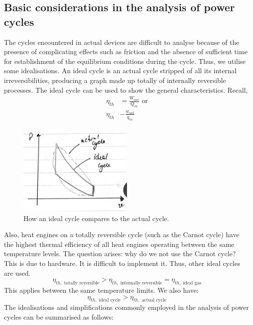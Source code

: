 \documentclass[class=report, crop=false, 12pt,a4paper]{standalone}
\begin{document}
\subsection{Basic considerations in the analysis of power cycles}
The cycles encountered in actual devices are difficult to analyse because of the presence of complicating effects such as friction and the absence of sufficient time for establishment of the equilibrium conditions during the cycle. Thus, we utilise some idealisations. An ideal cycle is an actual cycle stripped of all its internal irreversibilities, producing a graph made up totally of internally reversible processes. The ideal cycle can be used to show the general characteristics. Recall,
\begin{align}
  \eta_{th} &= \frac{W_{net}}{Q_{in}} \textrm{ or}\\
  \eta_{th} &- \frac{w_{net}}{q_{in}} 
\end{align}
\begin{figure}[h]
  \centering
  \includegraphics[width = 0.5\textwidth]{../img/actualvsidealcycle}
  \caption{How an ideal cycle compares to the actual cycle.}
  \label{fig:actualvsidealcycle}
\end{figure}
Also, heat engines on a totally reversible cycle (such as the Carnot cycle) have the highest thermal efficiency of all heat engines operating between the same temperature levels. The question arises: why do we not use the Carnot cycle? This is due to hardware. It is difficult to implement it. Thus, other ideal cycles are used.
\begin{equation}
  \eta_{th, \textrm{ totally reversible}} > \eta_{th, \textrm{ internally reversible}} = \eta_{th, \textrm{ ideal gas}}
\end{equation}
This applies between the same temperature limits. We also have:
\begin{equation}
  \eta_{th, \textrm{ ideal cycle}} > \eta_{th, \textrm{ actual cycle}}
\end{equation}
The idealisations and simplifications commonly employed in the analysis of power cycles can be summarised as follows:
\end{document}
